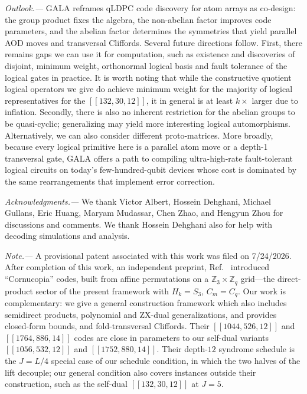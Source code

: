 \documentclass[amsmath,amssymb,twocolumn,aps,prl,superscriptaddress,nofootinbib]{revtex4-2}
\newcommand{\Z}{\mathbb{Z}}
\newcommand{\lead}[1]{\textit{#1.---}}
\theoremstyle{definition}
\begin{document}
\lead{Outlook} GALA reframes qLDPC code discovery for atom arrays as co-design: the group product fixes the algebra, the non-abelian factor improves code parameters, and the abelian factor determines the symmetries that yield parallel AOD moves and transversal Cliffords. Several future directions follow. First, there remains gaps we can use it for computation, such as existence and discoveries of disjoint, minimum weight, orthonormal logical basis and fault tolerance of the logical gates in practice. It is worth noting that while the constructive quotient logical operators we give do achieve minimum weight for the majority of logical representatives for the $[[132,30,12]]$, it in general is at least $k\times$ larger due to inflation. Secondly, there is also no inherent restriction for the abelian groups to be quasi-cyclic; generalizing may yield more interesting logical automorphisms. Alternatively, we can also consider different proto-matrices. More broadly, because every logical primitive here is a parallel atom move or a depth-1 transversal gate, GALA offers a path to compiling ultra-high-rate fault-tolerant logical circuits on today's few-hundred-qubit devices whose cost is dominated by the same rearrangements that implement error correction. 

\clearpage
\lead{Acknowledgments}
We thank Victor Albert, Hossein Dehghani, Michael Gullans, Eric Huang, Maryam Mudassar, Chen Zhao, and Hengyun Zhou for discussions and comments. We thank Hossein Dehghani also for help with decoding simulations and analysis. 

\lead{Note} A provisional patent associated with this work was filed on 7/24/2026. After completion of this work, an independent preprint, Ref.~\cite{lu2026cornucopia} introduced ``Cornucopia'' codes, built from affine permutations on a $\Z_3\times\Z_q$ grid---the direct-product sector of the present framework with $H_k=S_3$, $C_m=C_q$. Our work is complementary: we give a general construction framework which also includes semidirect products, polynomial and ZX-dual generalizations, and provides closed-form bounds, and fold-transversal Cliffords. Their $[[1044,526,12]]$ and $[[1764,886,14]]$ codes are close in parameters to our self-dual variants $[[1056,532,12]]$ and $[[1752,880,14]]$. Their depth-$12$ syndrome schedule is the $J=L/4$ special case of our schedule condition, in which the two halves of the lift decouple; our general condition also covers instances outside their construction, such as the self-dual $[[132,30,12]]$ at $J=5$.
\end{document}

